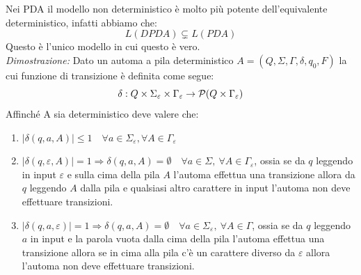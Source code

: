 Nei PDA il modello non deterministico è molto più potente dell'equivalente deterministico, infatti abbiamo che: 
\[ 
	L(DPDA) \subsetneq L(PDA)
\]
Questo è l'unico modello in cui questo è vero.\\
\textit{Dimostrazione:}
Dato un automa a pila deterministico $A = (Q,\Sigma,\Gamma,\delta,q_{0},F)$ la cui funzione di transizione è definita come segue:
\[
	\delta: Q\times \Sigma_{\varepsilon}\times\Gamma_{\varepsilon} \to {\cal P} (Q\times \Gamma_{\varepsilon})
\]
Affinch\'e A sia deterministico deve valere che:
\begin{enumerate}
	\item $|\delta(q,a,A)| \leq 1 \quad \forall  a \in \Sigma_{\varepsilon}, \forall A \in \Gamma_{\varepsilon}$
	\item $|\delta(q,\varepsilon,A)| = 1 \Rightarrow  \delta(q,a,A) = \emptyset \quad \forall  a \in \Sigma, \ \forall A \in \Gamma_{\varepsilon}$, ossia se da $q$ leggendo in input $\varepsilon$ e sulla cima della pila $A$ l'automa effettua una transizione allora da $q$ leggendo $A$ dalla pila e qualsiasi altro carattere in input l'automa non deve effettuare transizioni.
	\item $|\delta(q,a,\varepsilon)| = 1 \Rightarrow  \delta(q,a,A) = \emptyset \quad \forall  a \in \Sigma_{\varepsilon}, \ \forall A \in \Gamma$, ossia se da $q$ leggendo $a$ in input e la parola vuota dalla cima della pila l'automa effettua una transizione allora se in cima alla pila c'è un carattere diverso da $\varepsilon$ allora l'automa non deve effettuare transizioni.
\end{enumerate}

